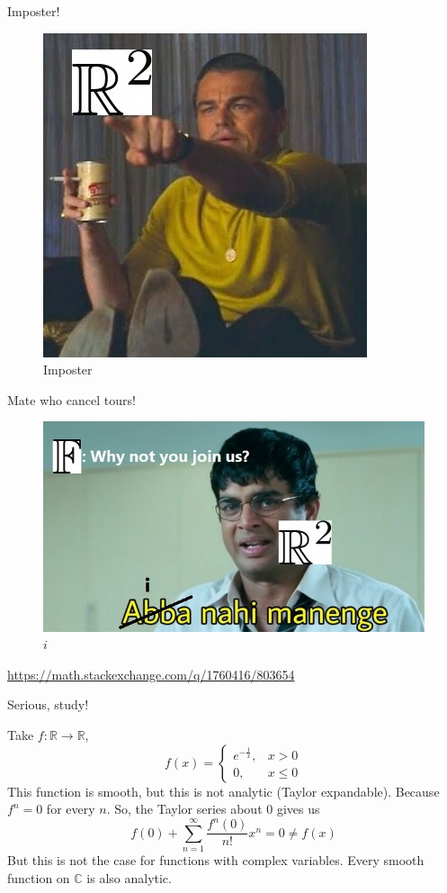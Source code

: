 \documentclass[11pt]{beamer}
\theoremstyle{plain}
\begin{document}
\begin{frame}{Imposter!}
        \begin{figure}[ht!]
    \centering
    \includegraphics[width=0.6\linewidth]{com_me.jpg}
    \caption{Imposter}
    \label{fig:com_me}
\end{figure}
\end{frame}

\begin{frame}{Mate who cancel tours!}
    \begin{figure}[ht!]
    \centering
    \includegraphics[width=0.7\linewidth]{i.jpg}
    \caption{$i$}
\end{figure}
\url{https://math.stackexchange.com/q/1760416/803654}
\end{frame}

\begin{frame}{Serious, study!}
    \begin{tcolorbox}
    Take $f:\mathbb R\rightarrow\mathbb R$, $$f(x)=\begin{cases}
        e^{-\frac{1}{x}},&x>0\\
        0, &x\leq 0
    \end{cases}$$  
    This function is smooth, but this is not analytic (Taylor expandable). Because $f^n=0$ for every $n$. So, the Taylor series about $0$ gives us $$f(0)+\sum_{n=1}^\infty\frac{f^n(0)}{n!}x^n=0\neq f(x)$$
    But this is not the case for functions with complex variables. Every smooth function on $\mathbb C$ is also analytic. 
    \end{tcolorbox}
\end{frame}
\end{document}
